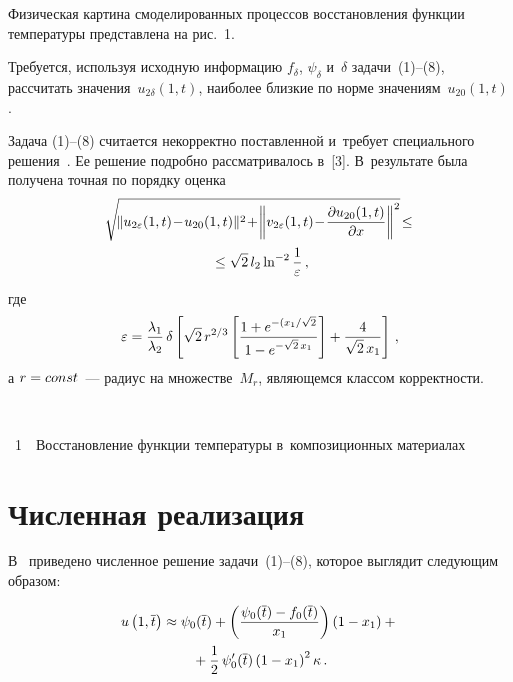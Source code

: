 \begin{multicols}{2}
  Физическая картина смоделированных процессов восстановления функции 
температуры пред\-став\-ле\-на на рис.~1.
  

  
  Требуется, используя исходную информацию $f_\delta$, $\psi_\delta$ и~$\delta$ 
задачи~(1)--(8), рассчитать значения~$u_{2\delta}(1,t)$, наиболее близкие по 
норме значениям~$u_{20}(1,t)$.
  
  Задача (1)--(8) считается некорректно по\-став\-лен\-ной и~требует специального 
решения~\cite{2-sr, 11-sr, 12-sr, 13-sr, 14-sr}. Ее решение подробно 
рассматривалось в~[3]. В~результате была получена точная по порядку оценка
 \begin{multline*}
  \!\sqrt{\!\| u_{2\varepsilon}(1,t)\!-\!u_{20}(1,t)\|^2\!+ \!\left \| 
  v_{2\varepsilon}(1,t)\!-\!
\fr{\partial u_{20}(1,t)}{\partial x}\right\|^2}\! \leq\\
{}\leq \sqrt{2}\,l_2\ln^{-
2}\fr{1}{\varepsilon}\,,
\end{multline*}
  где 
  $$
  \varepsilon=\displaystyle\frac{\displaystyle \lambda_1\mathstrut}{\displaystyle \lambda_2\mathstrut} \,\delta \left[  \sqrt{2}\,r^{2/3}\left[ 
\displaystyle\frac{\displaystyle 1+e^{-(x_1/\sqrt{2}}\mathstrut}{\displaystyle 1-e^{-\sqrt{2}\,x_1}\mathstrut}\right] 
+\displaystyle\frac{\displaystyle 4\mathstrut}{\displaystyle \sqrt{2}\,x_1\mathstrut}\right]\,,
  $$
  а $r\hm=const$~--- радиус на множестве~$M_r$, являющемся классом 
корректности.

{ \begin{center}  %
 \vspace*{9pt}
    \mbox{%
 \epsfxsize=76.504mm 
 }


\end{center}


\noindent
{{\figurename~1}\ \ \small{Восстановление функции температуры в~композиционных материалах}}
}



\section{Численная реализация}

  В~\cite{15-sr} приведено численное решение задачи~(1)--(8), которое 
выглядит следующим образом:

\noindent
  \begin{multline}
  u\left( 1,\overline{t}\right) \approx\psi_0(\overline{t})+\left( 
  \displaystyle\frac{\displaystyle \psi_0(\overline{t})-f_0(\overline{t})\mathstrut}{\displaystyle x_1\mathstrut}\right) \left(1-x_1\right) 
+{}\\
{}+\displaystyle\frac{\displaystyle 1\mathstrut}{\displaystyle 2\mathstrut}\,\psi_0^\prime (\overline{t}) \left(1-x_1\right)^2\kappa\,.
  \label{e9-sr}
  \end{multline}
  

\end{multicols}
